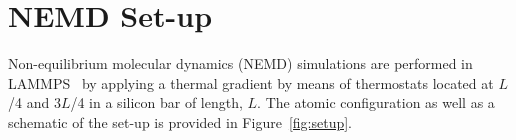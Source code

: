 \section{NEMD Set-up}
\label{sec:setup}

Non-equilibrium molecular dynamics (NEMD) simulations are performed in LAMMPS~\cite{Plimpton:2007}
by applying a thermal gradient by means of thermostats located at $L$/4 and $3L$/4 in a silicon bar of length, $L$. 
The atomic configuration as well as a schematic of the set-up is provided in Figure~\ref{fig:setup}. 
